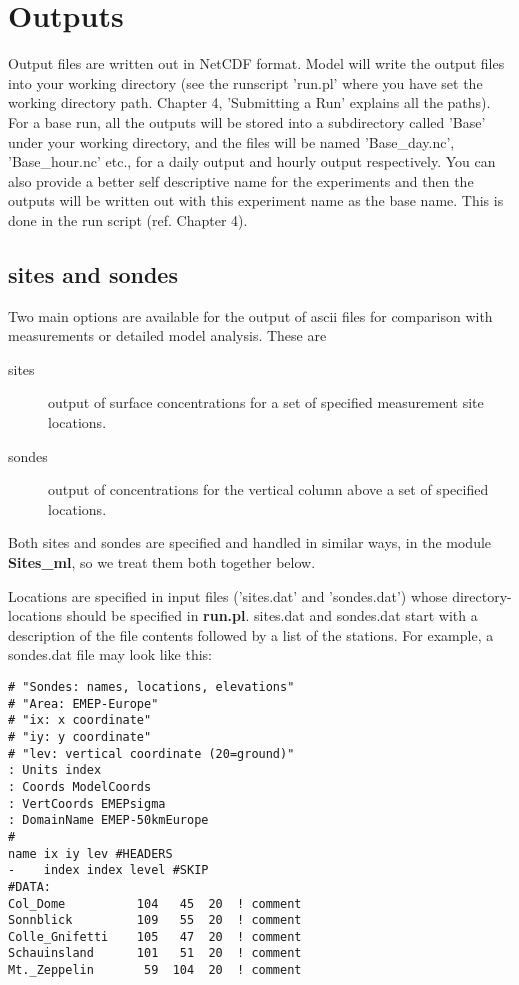 \chapter{Outputs}
\label{Output:ascii}

Output files are written out in NetCDF format.  
Model will write the output files into your working directory (see the
runscript 'run.pl' where you have set the working directory
path. Chapter 4, 'Submitting a Run' explains all the paths).  For a
base run, all the outputs will be stored into a subdirectory called
'Base' under your working directory, and the files will be named
'Base\_day.nc', 'Base\_hour.nc' etc., for a daily output and hourly
output respectively.  You can also provide a better self descriptive
name for the experiments and then the outputs will be written out with
this experiment name as the base name. This is done in the run
script (ref. Chapter 4).  


\section{sites and sondes}


Two main options are available for the output of ascii files for comparison
with measurements or detailed model analysis. These are

\begin{description}
\item[sites]  

      output of surface concentrations for a set of specified
      measurement site locations.
\item[sondes] 

      output of concentrations for the vertical column above
     a set of specified locations.
\end{description}

Both sites and sondes are specified and handled in similar ways, in
the module {\bf Sites\_ml}, so we treat them both together below.

Locations are specified in input files ('sites.dat' and 'sondes.dat')
whose directory-locations should be specified in {\bf run.pl}.
sites.dat and sondes.dat start with a description of the file contents
followed by a list of the stations. For example, a sondes.dat file
may look like this:


\begin{small}
\begin{verbatim}
# "Sondes: names, locations, elevations"
# "Area: EMEP-Europe"
# "ix: x coordinate"
# "iy: y coordinate"
# "lev: vertical coordinate (20=ground)"
: Units index
: Coords ModelCoords
: VertCoords EMEPsigma
: DomainName EMEP-50kmEurope
#
name ix iy lev #HEADERS
-    index index level #SKIP
#DATA:
Col_Dome          104   45  20  ! comment
Sonnblick         109   55  20  ! comment
Colle_Gnifetti    105   47  20  ! comment
Schauinsland      101   51  20  ! comment
Mt._Zeppelin       59  104  20  ! comment
\end{verbatim}
\end{small}

